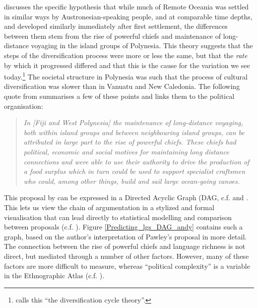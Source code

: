 \documentclass[a4paper,10pt]{article} %
\begin{document}
\citet{pawley81, pawley2007} discusses the specific hypothesis that while much of Remote Oceania was settled in similar ways by Austronesian-speaking people, and at comparable time depths, and developed similarly immediately after first settlement, the differences between them stem from the rise of powerful chiefs and maintenance of long-distance voyaging in the island groups of Polynesia. This theory suggests that the steps of the diversification process were more or less the same, but that the \emph{rate} by which it progressed differed and that this is the cause for the variation we see today.\footnote{\citet{lynch1981melanesian} calls this ``the diversification cycle theory''.} The societal structure in Polynesia was such that the process of cultural diversification was slower than in Vanuatu and New Caledonia. The following quote from \citet{pawley2007} summarises a few of these points and links them to the political organisation:


\begin{quotation}
\noindent \emph{In [Fiji and West Polynesia] the maintenance of long-distance voyaging, both within island groups and between neighbouring island groups, can be attributed in large part to the rise of powerful chiefs. These chiefs had political, economic and social motives for maintaining long distance connections and were able to use their authority to drive the production of a food surplus which in turn could be used to support specialist craftsmen who could, among other things, build and sail large ocean-going canoes.} \citep[28]{pawley2007} \end{quotation}

This proposal by \citet{pawley81, pawley2007} can be expressed in a Directed Acyclic Graph (DAG, c.f. \citet{pearl1995causal} and \citet{mcelreath2020statistical}. This lets us view the chain of argumentation in a stylized and formal visualisation that can lead directly to statistical modelling and comparison between proposals (c.f. \citet{roberts2020chield}). Figure \ref{Predicting_lgs_DAG_andy} contains such a graph, based on the author's interpretation of Pawley's proposal in more detail. The connection between the rise of powerful chiefs and language richness is not direct, but mediated through a number of other factors. However, many of these factors are more difficult to measure, whereas ``political complexity'' is a variable in the Ethnographic Atlas (c.f. \citet{gray1998ethnographic}).
\end{document}
